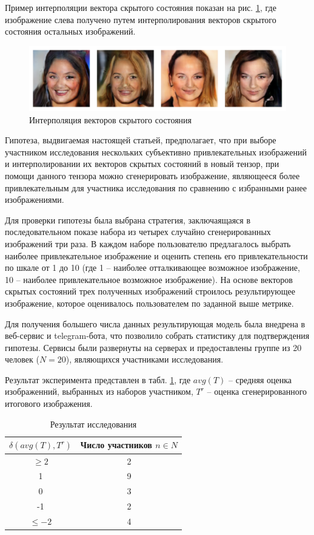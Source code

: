 \documentclass[60x84/16,8pt]{ittmm}
\begin{document}
Пример интерполяции вектора скрытого состояния показан на рис. \ref{fig:interpolation}, где изображение слева
получено путем интерполирования векторов скрытого состояния остальных изображений.

\begin{figure}
  \centering
  \includegraphics[width=0.8\linewidth]{interpolation}
  \caption{Интерполяция векторов скрытого состояния}
  \label{fig:interpolation}
\end{figure}

Гипотеза, выдвигаемая настоящей статьей, предполагает, что при выборе участником исследования
нескольких субъективно привлекательных изображений и интерполировании их векторов скрытых
состояний в новый тензор, при помощи данного тензора можно сгенерировать изображение,
являющееся более привлекательным для участника исследования по сравнению с избранными ранее
изображениями.

Для проверки гипотезы была выбрана стратегия, заключаящаяся в последовательном показе набора из четырех
случайно сгенерированных изображений три раза. В каждом наборе пользователю предлагалось выбрать
наиболее привлекательное изображение и оценить степень его привлекательности по шкале от 1 до 10
(где 1 -- наиболее отталкивающее возможное изображение, 10 -- наиболее привлекательное возможное изображение).
На основе векторов скрытых состояний трех полученных изображений строилось результирующее изображение,
которое оценивалось пользователем по заданной выше метрике.

Для получения большего числа данных результирующая модель была внедрена
в веб-сервис и telegram-бота, что позволило собрать статистику для подтверждения гипотезы.
Сервисы были развернуты на серверах и предоставлены группе из 20 человек (\(N = 20\)), являющихся участниками
исследования.

Результат эксперимента представлен в табл. \ref{tab:experiment},
где \(avg(T)\) -- средняя оценка изображенний, выбранных из наборов участником,
\(T^r\) -- оценка сгенерированного итогового изображения.

\begin{table}
  \centering
  \caption{Результат исследования}
  \label{tab:experiment}
  \begin{tabular}{|c|c|}
    \hline
    \(\delta (avg(T), T^r)\) & Число участников \(n \in N\) \\
    \hline
    \(\ge 2\) & 2 \\
    1         & 9 \\
    0         & 3 \\
    -1        & 2 \\
    \(\le -2\)& 4 \\
    \hline
  \end{tabular}
\end{table}
\end{document}
